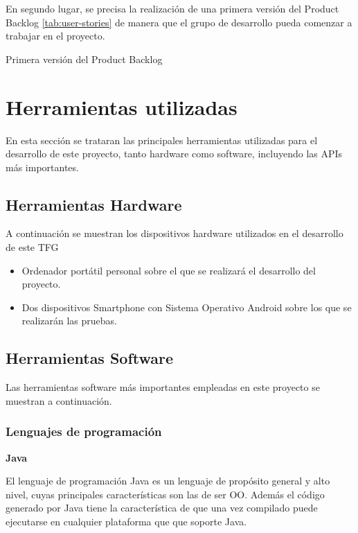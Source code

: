 En segundo lugar, se precisa la realización de una primera versión del Product Backlog \ref{tab:user-stories} de manera que el grupo de desarrollo pueda comenzar a trabajar en el proyecto.

\begin{table}[hp]
  \centering
  {\small
  
  }
  \caption[Primera versión del Product Backlog]
  {Primera versión del Product Backlog}
  \label{tab:user-stories}
\end{table}






\section{Herramientas utilizadas}

En esta sección se trataran las principales herramientas utilizadas para el desarrollo de este proyecto, tanto hardware como software, incluyendo las \acs{API}s más importantes.

\subsection{Herramientas Hardware}

A continuación se muestran los dispositivos hardware utilizados en el desarrollo de este \acs{TFG}
\begin{itemize}
\item Ordenador portátil personal sobre el que se realizará el desarrollo del proyecto.
\item Dos dispositivos Smartphone con Sistema Operativo Android sobre los que se realizarán las pruebas.
\end{itemize}

\subsection{Herramientas Software}

Las herramientas software más importantes empleadas en este proyecto se muestran a continuación.

\subsubsection{Lenguajes de programación}

\textbf{Java}

El lenguaje de programación Java es un lenguaje de propósito general y alto nivel, cuyas principales características son las de ser \ac{OO}. Además el código generado por Java tiene la característica de que una vez compilado puede ejecutarse en cualquier plataforma que que soporte Java.

